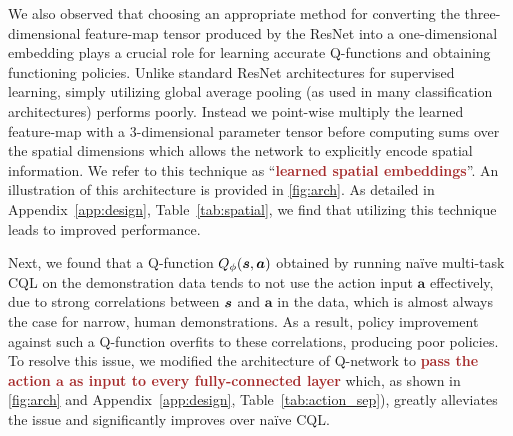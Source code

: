 We also observed that choosing an appropriate method for converting the three-dimensional feature-map tensor produced by the ResNet into a one-dimensional embedding plays a crucial role for learning accurate Q-functions and obtaining functioning policies. Unlike standard ResNet architectures for supervised learning, simply utilizing global average pooling (as used in many classification architectures) performs poorly. Instead we point-wise multiply the learned feature-map with a 3-dimensional parameter tensor before computing sums over the spatial dimensions which allows the network to explicitly encode spatial information. {We refer to this technique as ``\textcolor{brown}{\textbf{learned spatial embeddings}}''}. An illustration of this architecture is provided in \autoref{fig:arch}. As detailed in Appendix~\ref{app:design}, Table~\ref{tab:spatial}, {we find that utilizing this technique leads to improved performance}.

Next, we found that a Q-function $Q_\phi(\boldsymbol{s}, \boldsymbol{a})$ obtained by running na\"ive multi-task CQL on the demonstration data tends to not use the action input $\mathbf{a}$ effectively, due to strong correlations between $\boldsymbol{s}$ and $\mathbf{a}$ in the data, which is almost always the case for narrow, human demonstrations. As a result, policy improvement against such a Q-function overfits to these correlations, producing poor policies. To resolve this issue, we modified the architecture of Q-network to \textcolor{brown}{\textbf{pass the action \textbf{\textit{$\mathbf{a}$}} as input to every fully-connected layer}} which, as shown in \autoref{fig:arch} and {Appendix~\ref{app:design}}, {Table~\ref{tab:action_sep}}), greatly alleviates the issue {and significantly improves over na\"ive CQL}. 


